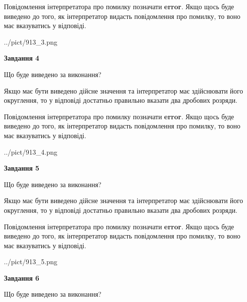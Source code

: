 \documentclass[12pt, ukrainian]{article}
\begin{document}
{\begin {Large}
Повідомлення інтерпретатора про помилку позначати \textbf{error}.
Якщо щось буде виведено до того, як інтерпретатор видасть повідомлення про помилку, 
то воно має вказуватись у відповіді. \par

\begin{center}
	{../pict/913_3.png}
\end{center}
\newpage

{\begin {center}\textbf{Завдання 4}\end {center}}\par
Що буде виведено за виконання? \par

Якщо має бути виведено дійсне значення та інтерпретатор має здійснювати його округлення, 
то у відповіді достатньо правильно вказати два дробових розряди.

Повідомлення інтерпретатора про помилку позначати \textbf{error}.
Якщо щось буде виведено до того, як інтерпретатор видасть повідомлення про помилку, 
то воно має вказуватись у відповіді. \par

\begin{center}
	{../pict/913_4.png}
\end{center}
\newpage

{\begin {center}\textbf{Завдання 5}\end {center}}\par
Що буде виведено за виконання? \par

Якщо має бути виведено дійсне значення та інтерпретатор має здійснювати його округлення, 
то у відповіді достатньо правильно вказати два дробових розряди.

Повідомлення інтерпретатора про помилку позначати \textbf{error}.
Якщо щось буде виведено до того, як інтерпретатор видасть повідомлення про помилку, 
то воно має вказуватись у відповіді. \par

\begin{center}
	{../pict/913_5.png}
\end{center}
\newpage

{\begin {center}\textbf{Завдання 6}\end {center}}\par
Що буде виведено за виконання? \par


\end{Large}}
\end{document}
